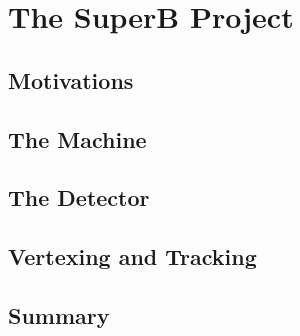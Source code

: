 \chapter{The SuperB Project}
\label{chap:SuperB}

\section{Motivations}

\section{The Machine}

\section{The Detector}

\section{Vertexing and Tracking}

\section{Summary}
